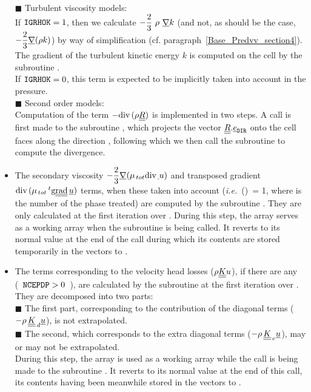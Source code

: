 \begin{itemize}
{\tiny$\blacksquare$} Turbulent viscosity models:\\
If $\text{\texttt{IGRHOK}}=1$, then we calculate $-\displaystyle \frac{2}{3}\ \rho\ \underline{\nabla} k$ (and not, as should be the case,
$-\displaystyle \frac{2}{3}\underline{\nabla} (\rho k)$) by way of simplification
(cf. paragraph~\ref{Base_Predvv_section4}). The gradient of the turbulent kinetic energy $k$ is computed on the cell by the subroutine . \\
If $\text{\texttt{IGRHOK}}=0$, this term is expected to be implicitly taken into account in the pressure.\\
{\tiny$\blacksquare$} Second order models:\\
Computation of the term $-\text{div}\,(\rho \underline{\underline{R}})$ is implemented in two steps. A call is first made to the subroutine , which projects the vector $\underline{\underline{R}}.\underline{e}_{\text{\texttt{DIR}}}$ onto the cell faces along the direction , following which we then call the subroutine  to compute the divergence.\\
\linebreak
\item The secondary viscosity $- \displaystyle \frac {2} {3}\underline{\nabla} (\mu_{\,tot} \text{div}\, \underline{\,}{u})$ and transposed gradient $ \text{div}\, (\mu_{\,tot} \,^t\text{g}\underline{\underline{\text{rad}}}\, \underline{u})$ terms, when these taken into account (\emph{i.e.} \,()\ = 1, where  is the number of the phase treated) are computed by the subroutine . They are only calculated at the first iteration over . During this step, the array  serves as a working array when the subroutine   is being called. It reverts to its normal value at the end of the call during which its contents are stored temporarily in the vectors  to .
\\
\item The terms corresponding to the velocity head losses ($\rho \underline{\underline{K}}
{u}$), if there are any (\ $\text{\texttt{NCEPDP}}> 0$\ ), are calculated by the subroutine  at the first iteration over . They are decomposed into two parts:\\
{\tiny$\blacksquare$} The first part, corresponding to the contribution of the diagonal terms ($-\rho\,\underline{\underline{K}}_{\,d}\underline{u}$), is not extrapolated.\\
{\tiny$\blacksquare$} The second, which corresponds to the extra diagonal terms
($-\rho\,\underline{\underline{K}}_{\,e}\underline{u}$), may or may not be extrapolated.\\
During this step, the array  is used as a working array while the call is being made to the subroutine . It reverts to its normal value at the end of this call, its contents having been meanwhile stored in the vectors  to .

\end{itemize}

